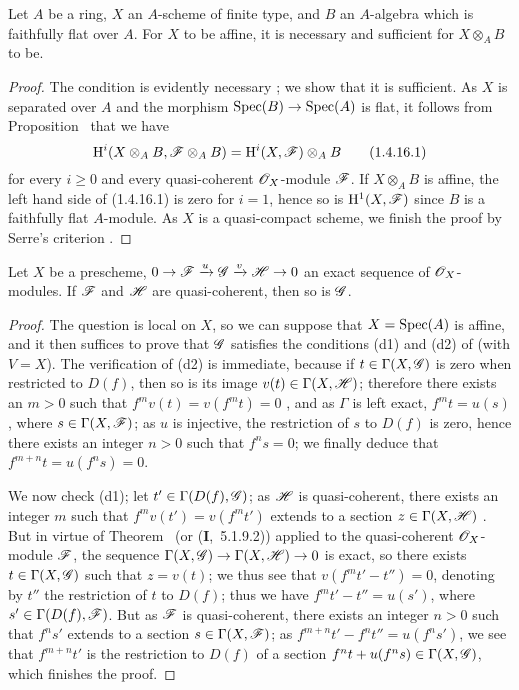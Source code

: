 \begin{corollary}[1.4.16]
\label{III.1.4.16}
Let $A$ be a ring, $X$ an $A$-scheme of finite type, and $B$ an $A$-algebra which is faithfully flat over $A$.
For $X$ to be affine, it is necessary and sufficient for $X\otimes_A B$ to be.
\end{corollary}

\begin{proof}
The condition is evidently necessary ; we show that it is sufficient.
As $X$ is separated over $A$ and the morphism $\Spec(B)\to\Spec(A)$ is flat, it follows from Proposition~ that we have
\[
\label{III.1.4.16.1}
  \mathrm{H}^i(X\otimes_A B,\mathscr{F}\otimes_A B)=\mathrm{H}^i(X,\mathscr{F})\otimes_A B
  \tag{1.4.16.1}
\]
for every $i\geq 0$ and every quasi-coherent $\mathscr{O}_X$-module $\mathscr{F}$.
If $X\otimes_A B$ is affine, the left hand side of (1.4.16.1) is zero for $i=1$, hence so is $\mathrm{H}^1(X,\mathscr{F})$ since $B$ is a faithfully flat $A$-module.
As $X$ is a quasi-compact scheme, we finish the proof by Serre's criterion .
\end{proof}

\begin{proposition}[1.4.17]
\label{III.1.4.17}
Let $X$ be a prescheme, $0\to\sh{F}\xrightarrow{u}\sh{G}\xrightarrow{v}\sh{H}\to 0$ an exact sequence of $\mathscr{O}_X$-modules.
If $\mathscr{F}$ and $\mathscr{H}$ are quasi-coherent, then so is $\mathscr{G}$.
\end{proposition}

\begin{proof}
The question is local on $X$, so we can suppose that $X=\operatorname{Spec}(A)$ is affine, and it then suffices to prove that $\mathscr{G}$ satisfies the conditions (d1) and (d2) of  (with $V=X$).
The verification of (d2) is immediate, because if $t\in\Gamma(X,\mathscr{G})$ is zero when restricted to $D(f)$, then so is its image $v(t)\in\Gamma(X,\mathscr{H})$; therefore there exists an $m>0$ such that $f^m v(t)=v(f^m t)=0$ , and as $\Gamma$ is left exact, $f^m t=u(s)$, where $s\in\Gamma(X,\mathscr{F})$; as $u$ is injective, the restriction of $s$ to $D(f)$ is zero, hence  there exists an integer $n>0$ such that $f^n s=0$; we finally deduce that $f^{m+n}t=u(f^n s)=0$.

We now check (d1); let $t'\in\Gamma(D(f),\mathscr{G})$; as $\mathscr{H}$ is quasi-coherent, there exists an integer $m$ such that $f^m v(t')=v(f^m t')$ extends to a section $z\in\Gamma(X,\mathscr{H})$ .
But in virtue of Theorem~ (or (\textbf{I},~5.1.9.2)) applied to the quasi-coherent $\mathscr{O}_X$-module $\mathscr{F}$, the sequence $\Gamma(X,\sh{G})\to\Gamma(X,\sh{H})\to 0$ is exact, so there exists $t\in\Gamma(X,\mathscr{G})$ such that $z=v(t)$; we thus see that $v(f^m t'-t'')=0$, denoting by $t''$ the restriction of $t$ to $D(f)$; thus we have $f^m t'-t''=u(s')$, where $s'\in\Gamma(D(f),\mathscr{F})$.
But as $\mathscr{F}$ is quasi-coherent, there exists an integer $n>0$ such that $f^n s'$ extends to a section $s\in\Gamma(X,\mathscr{F})$; as $f^{m+n}t'-f^n t''=u(f^n s')$, we see that $f^{m+n}t'$ is the restriction to $D(f)$ of a section $f^n t+u(f^n s)\in\Gamma(X,\mathscr{G})$, which finishes the proof.
\end{proof}


